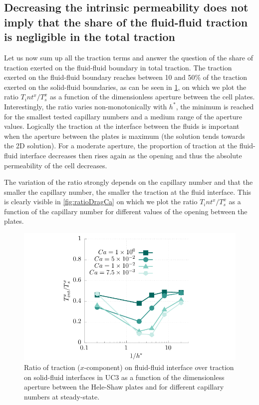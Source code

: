 \documentclass[]{article}
\begin{document}
\hypertarget{decreasing-the-intrinsic-permeability-does-not-imply-that-the-share-of-the-fluid-fluid-traction-is-negligible-in-the-total-traction}{%
\subsection{Decreasing the intrinsic permeability does not imply that
the share of the fluid-fluid traction is negligible in the total
traction}\label{decreasing-the-intrinsic-permeability-does-not-imply-that-the-share-of-the-fluid-fluid-traction-is-negligible-in-the-total-traction}}

Let us now sum up all the traction terms and answer the question of the
share of traction exerted on the fluid-fluid boundary in total traction.
The traction exerted on the fluid-fluid boundary reaches between 10 and
50\% of the traction exerted on the solid-fluid boundaries, as can be
seen in \cref{fig:ratioDrag}, on which we plot the ratio
\(T_int^x/T_s^x\) as a function of the dimensionless aperture between
the cell plates. Interestingly, the ratio varies non-monotonically with
\(h^*\), the minimum is reached for the smallest tested capillary
numbers and a medium range of the aperture values. Logically the
traction at the interface between the fluids is important when the
aperture between the plates is maximum (the solution tends towards the
2D solution). For a moderate aperture, the proportion of traction at the
fluid-fluid interface decreases then rises again as the opening and thus
the absolute permeability of the cell decreases.

The variation of the ratio strongly depends on the capillary number and
that the smaller the capillary number, the smaller the traction at the
fluid interface. This is clearly visible in \cref{fig:ratioDragCa} on
which we plot the ratio \(T_int^x/T_s^x\) as a function of the capillary
number for different values of the opening between the plates.

\begin{figure}
\hypertarget{fig:ratioDrag}{%
\centering
\includegraphics{figures/pdf/ratioDrag.pdf}
\caption{Ratio of traction (\(x\)-component) on fluid-fluid interface
over traction on solid-fluid interfaces in UC3 as a function of the
dimensionless aperture between the Hele-Shaw plates and for different
capillary numbers at steady-state.}\label{fig:ratioDrag}
}
\end{figure}
\end{document}

